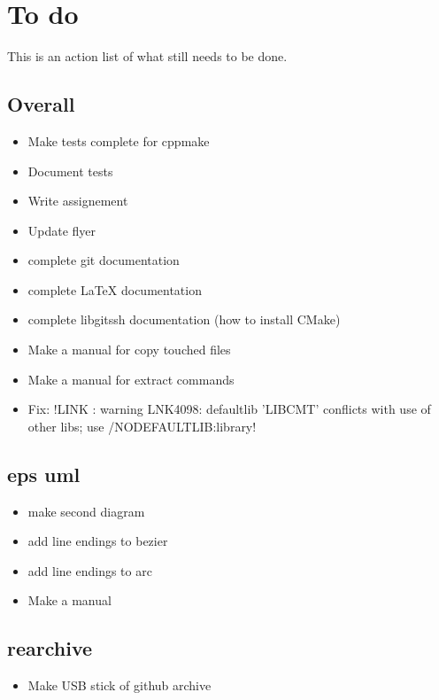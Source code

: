 \chapter*{To do}

This is an action list of what still needs to be done.

\section*{Overall}

\begin{itemize}
\item Make tests complete for cppmake
\item Document tests
\item Write assignement
\item Update flyer
\item complete git documentation
\item complete LaTeX documentation
\item complete libgitssh documentation (how to install CMake)
\item Make a manual for copy touched files
\item Make a manual for extract commands
\item Fix: !LINK : warning LNK4098: defaultlib 'LIBCMT' conflicts with use of other libs; use /NODEFAULTLIB:library!
\end{itemize}

\section*{eps uml}

\begin{itemize}
\item make second diagram
\item add line endings to bezier
\item add line endings to arc
\item Make a manual
\end{itemize}

\section*{rearchive}

\begin{itemize}
\item Make USB stick of github archive
\end{itemize}
